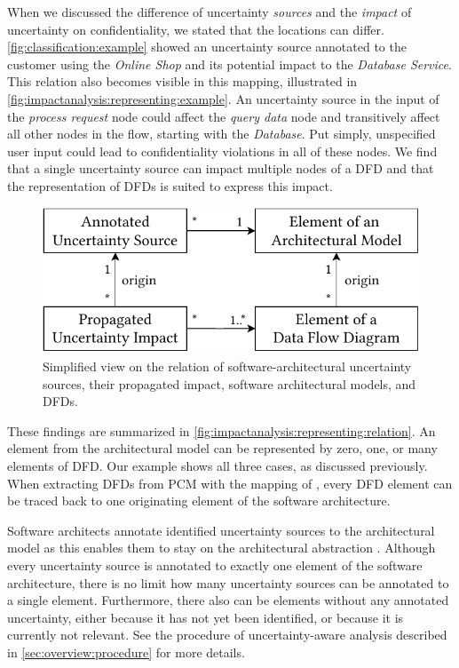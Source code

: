 When we discussed the difference of uncertainty \emph{sources} and the \emph{impact} of uncertainty on confidentiality, we stated that the locations can differ.
\autoref{fig:classification:example} showed an uncertainty source annotated to the customer using the \emph{Online Shop} and its potential impact to the \emph{Database Service}.
This relation also becomes visible in this mapping, illustrated in \autoref{fig:impactanalysis:representing:example}.
An uncertainty source in the input of the \emph{process request} node could affect the \emph{query data} node and transitively affect all other nodes in the flow, starting with the \emph{Database}.
Put simply, unspecified user input could lead to confidentiality violations in all of these nodes.
We find that a single uncertainty source can impact multiple nodes of a \ac{DFD} and that the representation of \acp{DFD} is suited to express this impact.

\begin{figure}
    \centering
    \includegraphics[width=0.65\linewidth]{figures/chapter6/relation-source-impact.pdf}
    \caption{Simplified view on the relation of software-architectural uncertainty sources, their propagated impact, software architectural models, and \acfp*{DFD}.}
    \label{fig:impactanalysis:representing:relation}
\end{figure}

These findings are summarized in \autoref{fig:impactanalysis:representing:relation}.
An element from the architectural model can be represented by zero, one, or many elements of \ac{DFD}.
Our example shows all three cases, as discussed previously.
When extracting \acp{DFD} from \ac{PCM} with the mapping of \textcite{seifermann_architectural_2022}, every \ac{DFD} element can be traced back to one originating element of the software architecture.

Software architects annotate identified uncertainty sources to the architectural model as this enables them to stay on the architectural abstraction \cite{hahner_architectural_2021}.
Although every uncertainty source is annotated to exactly one element of the software architecture, there is no limit how many uncertainty sources can be annotated to a single element.
Furthermore, there also can be elements without any annotated uncertainty, either because it has not yet been identified, or because it is currently not relevant.
See the procedure of uncertainty-aware analysis described in \autoref{sec:overview:procedure} for more details.

